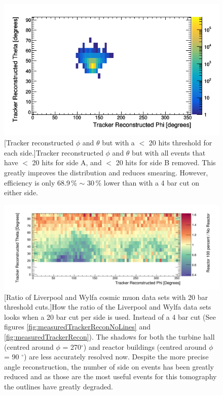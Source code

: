 \begin{figure}[!h]
 \centering
 \includegraphics[width=0.7\linewidth]{Chapter5/Figs/cosmicTrackerUncertainties/pVsT135FidFix_20barCutPerSide.png}
 [Tracker reconstructed $\phi$ and $\theta$ but with a $<$ 20 hits threshold for each side.]{Tracker reconstructed $\phi$ and $\theta$ but with all events that have $<$ 20 hits for side A, and $<$ 20 hits for side B removed. This greatly improves the distribution and reduces smearing. However, efficiency is only 68.9\,\% $\sim$ 30\,\% lower than with a 4 bar cut on either side.} 
 \label{fig:pVsT135FidFix_20barCutPerSide}
\end{figure}

\begin{figure}[!h]
 \centering
 \includegraphics[width=\linewidth]{Chapter6/Figs/simulatedMeasuredCut20Bars.png}
 [Ratio of Liverpool and Wylfa cosmic muon data sets with 20 bar threshold cuts.]{How the ratio of the Liverpool and Wylfa data sets looks when a 20 bar cut per side is used. Instead of a 4 bar cut (See figures \ref{fig:measuredTrackerReconNoLines} and \ref{fig:measuredTrackerRecon}). The shadows for both the turbine hall (centred around $\phi$ = 270$^\circ$) and reactor buildings (centred around $\phi$ = 90 $^\circ$) are less accurately resolved now. Despite the more precise angle reconstruction, the number of side on events has been greatly reduced and as those are the most useful events for this tomography the outlines have greatly degraded.}
 \label{fig:20CutRatioWylfaDivLiv}
\end{figure}

